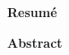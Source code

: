 
\begin{center}
        \bf Resumé
    \end{center}
\lipsum[1]


\begin{center}
        \bf Abstract
    \end{center}
\lipsum[1]

